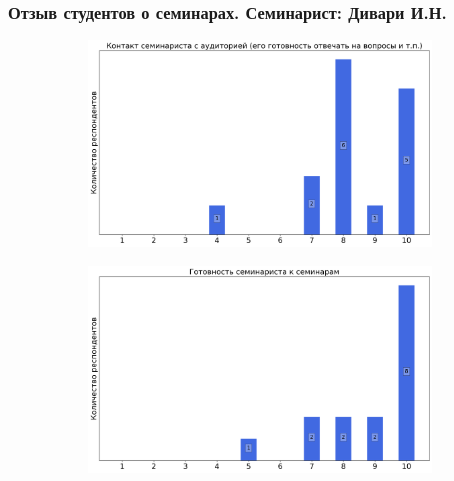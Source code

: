     
    \subsubsection{Отзыв студентов о семинарах. Семинарист: Дивари И.Н.}
        \begin{figure}[H]
            \centering
            \begin{subfigure}[b]{0.45\textwidth}
                \centering
                \includegraphics[width=\textwidth]{images/1 course/Информатика/seminarists-marks-Дивари И.Н.-0.png}
            \end{subfigure}
            \begin{subfigure}[b]{0.45\textwidth}
                \centering
                \includegraphics[width=\textwidth]{images/1 course/Информатика/seminarists-marks-Дивари И.Н.-1.png}
            \end{subfigure}
            \begin{subfigure}[b]{0.45\textwidth}
                \centering

\end{subfigure}
\end{figure}
